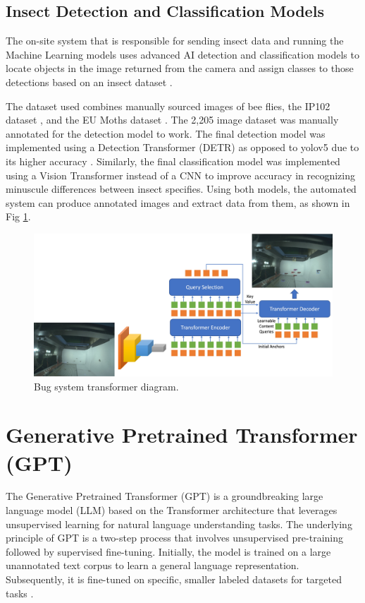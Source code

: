 \subsection{Insect Detection and Classification Models}
The on-site system that is responsible for sending insect data and running the Machine Learning models uses advanced AI detection and classification models to locate objects in the image returned from the camera and assign classes to those detections based on an insect dataset \cite{helton_luu_dowling_2022}.

The dataset used combines manually sourced images of bee flies, the IP102 dataset \cite{8954351}, and the EU Moths dataset \cite{DBLP:conf/gi/KorschBD21}. The 2,205 image dataset was manually annotated for the detection model to work. The final detection model was implemented using a Detection Transformer (DETR) as opposed to yolov5 due to its higher accuracy \cite{li2022dndetr}. Similarly, the final classification model was implemented using a Vision Transformer instead of a CNN to improve accuracy in recognizing minuscule differences between insect specifies. Using both models, the automated system can produce annotated images and extract data from them, as shown in Fig \ref{fig:3.3}.

\begin{figure}[H]
\begin{center}
\includegraphics[width=1.0\linewidth]{Honors_Thesis/Figures/3.3.jpg}
\end{center}
\caption{Bug system transformer diagram.}
\label{fig:3.3}
\end{figure}

\section{Generative Pretrained Transformer (GPT)}
The Generative Pretrained Transformer (GPT) is a groundbreaking large language model (LLM) based on the Transformer architecture that leverages unsupervised learning for natural language understanding tasks. The underlying principle of GPT is a two-step process that involves unsupervised pre-training followed by supervised fine-tuning. Initially, the model is trained on a large unannotated text corpus to learn a general language representation. Subsequently, it is fine-tuned on specific, smaller labeled datasets for targeted tasks \cite{radford_narasimhan_salimans_sutskever}.

